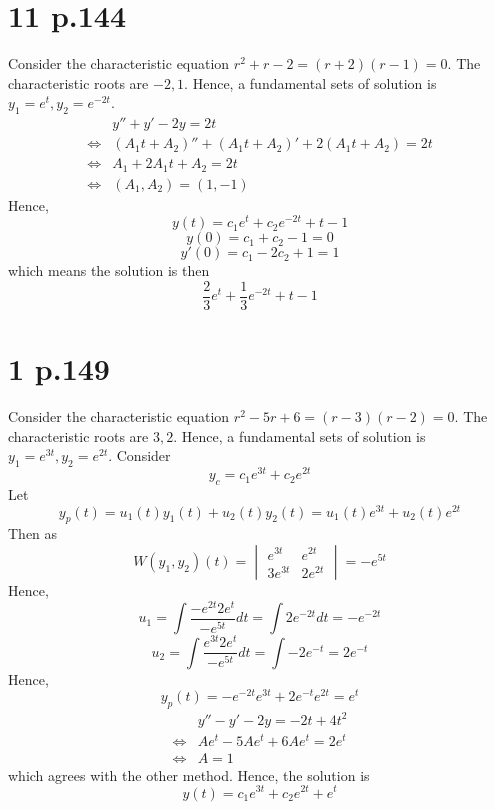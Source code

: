 \documentclass[11pt]{article}
\begin{document}
\section*{11 p.144}
Consider the characteristic equation $r^2+r-2=(r+2)(r-1)=0$. The characteristic roots are $-2,1$.
Hence, a fundamental sets of solution is $y_1 = e^{t}, y_2 = e^{-2t}$.
\begin{equation*}
    \begin{aligned}
        & y''+y'-2y = 2t\\
        \iff & (A_1t + A_2)'' + (A_1t + A_2)' + 2(A_1t + A_2) = 2t \\
        \iff & A_1 + 2A_1t + A_2 = 2t\\
        \iff & (A_1,A_2) = (1,-1)
    \end{aligned}
\end{equation*}
Hence, 
\[
    y(t) = c_1e^{t} + c_2e^{-2t} +t -1  
\]
\[
    y(0) = c_1 + c_2 - 1 = 0    
\]
\[
    y'(0) = c_1 - 2c_2 + 1 = 1    
\]
which means the solution is then 
\[
    \frac{2}{3}e^t + \frac{1}{3}e^{-2t} + t-1    
\]
\newpage
\section*{1 p.149}
Consider the characteristic equation $r^2-5r+6= (r-3)(r-2)= 0$. The characteristic roots are $3,2$.
Hence, a fundamental sets of solution is $y_1 = e^{3t}, y_2 = e^{2t}$. 
Consider 
\[
    y_c = c_1e^{3t} + c_2e^{2t}    
\]
Let 
\[
    y_p(t) = u_1(t)y_1(t) + u_2(t)y_2(t) = u_1(t) e^{3t} + u_2(t)e^{2t}    
\]
Then as 
\[
    W(y_1,y_2)(t) = 
    \begin{vmatrix}
        e^{3t} & e^{2t} \\
        3e^{3t} & 2e^{2t}
    \end{vmatrix} = -e^{5t}
\]
Hence, 
\[
    u_1 = \int \frac{-e^{2t}2e^{t}}{-e^{5t}} dt = \int 2e^{-2t} dt = -e^{-2t}    
\]
\[
    u_2 = \int \frac{e^{3t}2e^t}{-e^{5t}} dt = \int -2e^{-t} = 2e^{-t}
\]
Hence, 
\[
    y_p(t) = -e^{-2t}e^{3t} + 2e^{-t}e^{2t} = e^t    
\]
\begin{equation*}
    \begin{aligned}
        & y'' -y'-2y = -2t+4t^2 \\
        \iff &  Ae^t - 5Ae^t +6Ae^t = 2e^t \\
        \iff & A = 1
    \end{aligned}
\end{equation*}
which agrees with the other method. 
Hence, the solution is 
\[
    y(t) = c_1e^{3t} + c_2e^{2t} + e^t
\]
\newpage
\end{document}
